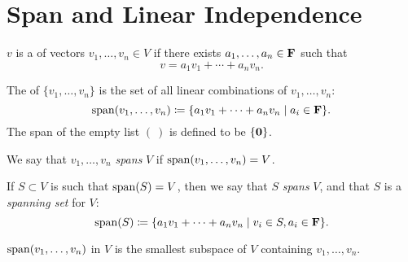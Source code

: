 \section{Span and Linear Independence}
\begin{definition}\label{def:linear-combination}
$v$ is a  of vectors $v_1,\dots,v_n\in V$ if there exists $a_1,\dots,a_n\in\mathbf F$ such that
\[v=a_1v_1+\cdots+a_nv_n.\]
\end{definition}

\begin{definition}[Span]\label{def:span}
The  of $\{v_1,\dots,v_n\}$ is the set of all linear combinations of $v_1,\dots,v_n$:
\[\operatorname{span}(v_1,\dots,v_n)\coloneqq\{a_1v_1+\cdots+a_nv_n\mid a_i\in\mathbf F\}.\]
The span of the empty list $(\:)$ is defined to be $\{\vb{0}\}$.

We say that $v_1,\dots,v_n$ \emph{spans} $V$ if $\operatorname{span}(v_1,\dots,v_n)=V$.

If $S\subset V$ is such that $\operatorname{span}(S)=V$, then we say that $S$ \emph{spans} $V$, and that $S$ is a \emph{spanning set} for $V$:
\[\operatorname{span}(S)\coloneqq\{a_1v_1+\cdots+a_nv_n\mid v_i\in S, a_i\in\mathbf F\}.\]
\end{definition}

\begin{proposition}
$\operatorname{span}(v_1,\dots,v_n)$ in $V$ is the smallest subspace of $V$ containing $v_1,\dots,v_n$.
\end{proposition}

